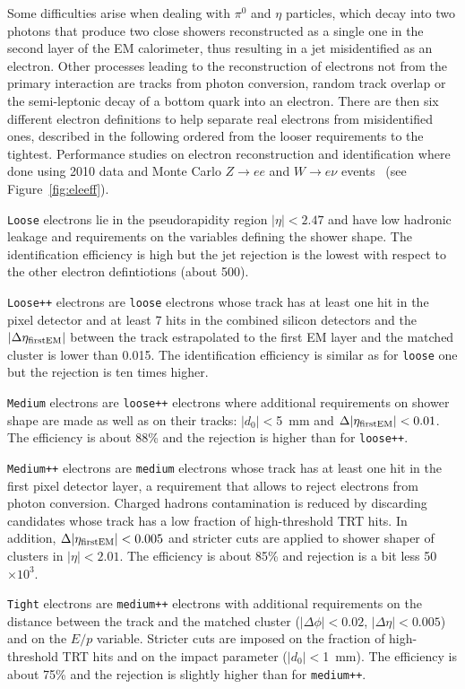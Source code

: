 Some difficulties arise when dealing with $\pi^0$ and $\eta$ particles, 
which decay into two photons that produce two close 
showers reconstructed as a single one in the second layer of the EM
calorimeter, thus resulting in a jet misidentified as an electron.
Other processes leading to the reconstruction of electrons 
not from the primary interaction are tracks from photon conversion,
random track overlap or the semi-leptonic decay of a bottom quark into an electron.
There are then six different electron definitions to help 
separate real electrons from misidentified ones,
described in the following ordered from the looser requirements to the tightest.
Performance studies on electron reconstruction and identification where done using 2010 data and Monte
Carlo $Z\to ee$ and $W\to e\nu$ events~\cite{eperf} (see Figure~\ref{fig:eleeff}). 

\texttt{Loose} electrons lie in the pseudorapidity region $|\eta| < 2.47$ and have 
low hadronic leakage and requirements on the variables defining the shower shape.
The identification efficiency is high but the jet rejection is the lowest
with respect to the other electron defintiotions (about 500).

\texttt{Loose++} electrons are \texttt{loose} electrons whose track has at least one hit in 
the pixel detector and at least 7 hits in the combined silicon detectors and the
$|\Delta\eta_{\rm first EM}|$ between the track estrapolated to the first EM layer and
the matched cluster is lower than 0.015. The identification
efficiency is similar as for \texttt{loose} one but the rejection is ten times higher.

\texttt{Medium} electrons are \texttt{loose++} electrons where additional requirements on shower shape
are made as well as on their tracks: $|d_0|<$5~mm and $\Delta|\eta_{\rm first EM}|<0.01$.
The efficiency is about 88\% and the rejection is
higher than for \texttt{loose++}.

\texttt{Medium++} electrons are \texttt{medium} electrons whose track has at least one hit in the
first pixel detector layer, a requirement that allows to reject electrons from
photon conversion. Charged hadrons contamination is reduced by discarding candidates
whose track has a low fraction of high-threshold TRT hits. In addition, $\Delta|\eta_{\rm first EM}|<0.005$ 
and stricter cuts are applied to shower shaper of clusters in $|\eta|<2.01$. The
efficiency is about 85\% and rejection is a bit less 50$\times 10^3$.

\texttt{Tight} electrons are \texttt{medium++} electrons with additional requirements on the distance
between the track and the matched cluster ($|\Delta\phi|<0.02$, $|\Delta\eta|<0.005$) and on the $E/p$
variable. Stricter cuts are imposed on the fraction of high-threshold TRT hits and on the impact parameter
($|d_0|<$1~mm). The efficiency is about 75\% and the rejection is slightly higher than 
for \texttt{medium++}.

